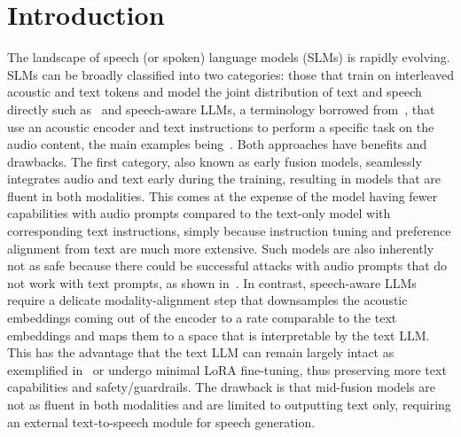 \documentclass[9pt,conference]{IEEEtran}
\begin{document}
\section{Introduction}
The landscape of speech (or spoken) language models (SLMs) is rapidly evolving. SLMs can be broadly classified into two categories: those that train on interleaved acoustic and text tokens and model the joint distribution of text and speech directly such as~\cite{team2023gemini,xie2024mini} and speech-aware LLMs, a terminology borrowed from~\cite{arora2025landscape}, that use an acoustic encoder and text instructions to perform a specific task on the audio content, the main examples being~\cite{grattafiori2024llama,abouelenin2025phi,ma2024embarrassingly,tangsalmonn,chu2024qwen2}. Both approaches have benefits and drawbacks. The first category, also known as early fusion models, seamlessly integrates audio and text early during the training, resulting in models that are fluent in both modalities. This comes at the expense of the model having fewer capabilities with audio prompts compared to the text-only model with corresponding text instructions, simply because instruction tuning and preference alignment from text are much more extensive. Such models are also inherently not as safe because there could be successful attacks with audio prompts that do not work with text prompts, as shown in~\cite{costa2024mutox}. In contrast, speech-aware LLMs require a delicate modality-alignment step that downsamples the acoustic embeddings coming out of the encoder to a rate comparable to the text embeddings and maps them to a space that is interpretable by the text LLM. This has the advantage that the text LLM can remain largely intact as exemplified in~\cite{grattafiori2024llama,ma2024embarrassingly,fan2024alignformer} or undergo minimal LoRA fine-tuning, thus preserving more text capabilities and safety/guardrails. The drawback is that mid-fusion models are not as fluent in both modalities and are limited to outputting text only, requiring an external text-to-speech module for speech generation.
\end{document}
